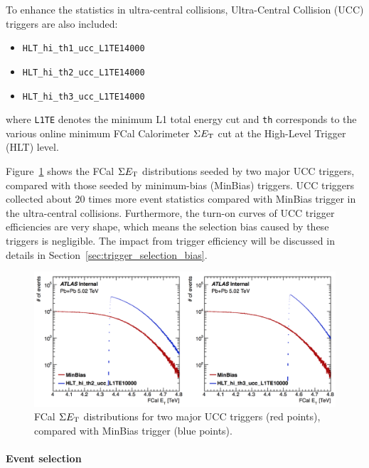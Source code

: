 To enhance the statistics in ultra-central collisions, Ultra-Central Collision (UCC) triggers are also included:
\begin{itemize}
\item \verb|HLT_hi_th1_ucc_L1TE14000|
\item \verb|HLT_hi_th2_ucc_L1TE14000|
\item \verb|HLT_hi_th3_ucc_L1TE14000|
\end{itemize}
where \verb|L1TE| denotes the minimum L1 total energy cut and \verb|th| corresponds to the various online minimum FCal Calorimeter $\Sigma E_\text{T}$ cut at the High-Level Trigger (HLT) level.

Figure~\ref{fig:detector_ATLAS_trigger_PbPb502} shows the FCal $\Sigma E_\text{T}$ distributions seeded by two major UCC triggers, compared with those seeded by minimum-bias (MinBias) triggers. UCC triggers collected about 20 times more event statistics compared with MinBias trigger in the ultra-central collisions. Furthermore, the turn-on curves of UCC trigger efficiencies are very shape, which means the selection bias caused by these triggers is negligible. The impact from trigger efficiency will be discussed in details in Section~\ref{sec:trigger_selection_bias}.

\begin{figure}[H]
\centering
\includegraphics[width=.95\linewidth]{figs/chapter_detector/ATLAS_trigger_PbPb502.png}
\caption{FCal $\Sigma E_\text{T}$ distributions for two major UCC triggers (red points), compared with MinBias trigger (blue points).}
\label{fig:detector_ATLAS_trigger_PbPb502}
\end{figure}



\paragraph{Event selection}
\label{sec:event_selection}

